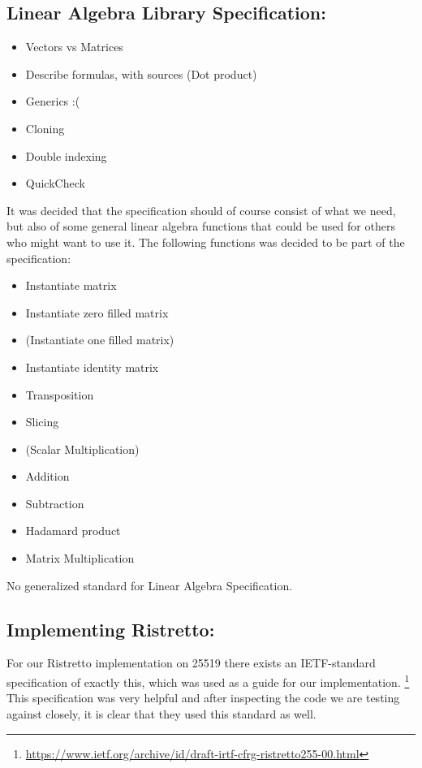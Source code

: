 \documentclass{article}
\begin{document}
\subsection{Linear Algebra Library Specification:}
\begin{itemize}
	\item Vectors vs Matrices 
	\item Describe formulas, with sources (Dot product) 
	\item Generics :(
	\item Cloning
	\item Double indexing
	\item QuickCheck
\end{itemize} 
It was decided that the specification should of course consist of what we need, but also of some general linear algebra functions that could be used for others who might want to use it. The following functions was decided to be part of the specification:
\begin{itemize}
	\item Instantiate matrix
	\item Instantiate zero filled matrix
	\item (Instantiate one filled matrix)
	\item Instantiate identity matrix
	\item Transposition
	\item Slicing
	\item (Scalar Multiplication)
	\item Addition
	\item Subtraction
	\item Hadamard product
	\item Matrix Multiplication
\end{itemize}

No generalized standard for Linear Algebra Specification.

\subsection{Implementing Ristretto:} \label{implementing-ristretto}

For our Ristretto implementation on 25519 there exists an IETF-standard specification of exactly this, which was used as a guide for our implementation. \footnote{\url{https://www.ietf.org/archive/id/draft-irtf-cfrg-ristretto255-00.html}} This specification was very helpful and after inspecting the code we are testing against closely, it is clear that they used this standard as well. 
\end{document}
